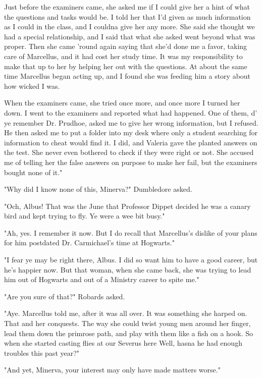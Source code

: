 \textooquote Just before the examiners came, she asked me if I could give her a hint of what the questions and tasks would be. I told her that I'd given as much information as I could in the class, and I couldna give her any more. She said she thought we had a special relationship, and I said that what she asked went beyond what was proper. Then she came 'round again saying that she'd done me a favor, taking care of Marcellus, and it had cost her study time. It was my responsibility to make that up to her by helping her out with the questions. At about the same time Marcellus began acting up, and I found she was feeding him a story about how wicked I was.

\textooquote When the examiners came, she tried once more, and once more I turned her down. I went to the examiners and reported what had happened. One of them, d' ye remember Dr. Prudhoe, asked me to give her wrong information, but I refused. He then asked me to put a folder into my desk where only a student searching for information to cheat would find it. I did, and Valeria gave the planted answers on the test. She never even bothered to check if they were right or not. She accused me of telling her the false answers on purpose to make her fail, but the examiners bought none of it."

"Why did I know none of this, Minerva?" Dumbledore asked.

"Och, Albus! That was the June that Professor Dippet decided he was a canary bird and kept trying to fly. Ye were a wee bit busy."

"Ah, yes. I remember it now. But I do recall that Marcellus's dislike of your plans for him postdated Dr. Carmichael's time at Hogwarts."

"I fear ye may be right there, Albus. I did so want him to have a good career, but he's happier now. But that woman, when she came back, she was trying to lead him out of Hogwarts and out of a Ministry career to spite me."

"Are you sure of that?" Robards asked.

"Aye. Marcellus told me, after it was all over. It was something she harped on. That and her conquests. The way she could twist young men around her finger, lead them down the primrose path, and play with them like a fish on a hook. So when she started casting flies at our Severus here{\el} Well, hasna he had enough troubles this past year?"

"And yet, Minerva, your interest may only have made matters worse."

